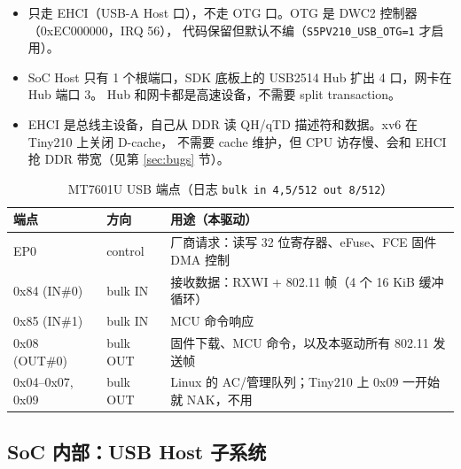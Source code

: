 \documentclass[UTF8,zihao=-4,fontset=none]{ctexart}
\newcommand{\fn}[1]{\texttt{#1}}
\begin{document}
\begin{itemize}[leftmargin=2em]
\item 只走 EHCI（USB-A Host 口），不走 OTG 口。OTG 是 DWC2 控制器（0xEC000000，IRQ 56），
  代码保留但默认不编（\fn{S5PV210\_USB\_OTG=1} 才启用）。
\item SoC Host 只有 1 个根端口，SDK 底板上的 USB2514 Hub 扩出 4 口，网卡在 Hub 端口 3。
  Hub 和网卡都是高速设备，不需要 split transaction。
\item EHCI 是总线主设备，自己从 DDR 读 QH/qTD 描述符和数据。xv6 在 Tiny210 上关闭 D-cache，
  不需要 cache 维护，但 CPU 访存慢、会和 EHCI 抢 DDR 带宽（见第 \ref{sec:bugs} 节）。
\end{itemize}

\begin{table}[H]\centering\small
\begin{tabular}{lll}
\toprule
端点 & 方向 & 用途（本驱动） \\ \midrule
EP0 & control & 厂商请求：读写 32 位寄存器、eFuse、FCE 固件 DMA 控制 \\
0x84 (IN\#0) & bulk IN & 接收数据：RXWI + 802.11 帧（4 个 16 KiB 缓冲循环） \\
0x85 (IN\#1) & bulk IN & MCU 命令响应 \\
0x08 (OUT\#0) & bulk OUT & 固件下载、MCU 命令，以及本驱动所有 802.11 发送帧 \\
0x04--0x07, 0x09 & bulk OUT & Linux 的 AC/管理队列；Tiny210 上 0x09 一开始就 NAK，不用 \\
\bottomrule
\end{tabular}
\caption{MT7601U USB 端点（日志 \fn{bulk in 4,5/512 out 8/512}）}
\end{table}

\subsection{SoC 内部：USB Host 子系统}
\end{document}
